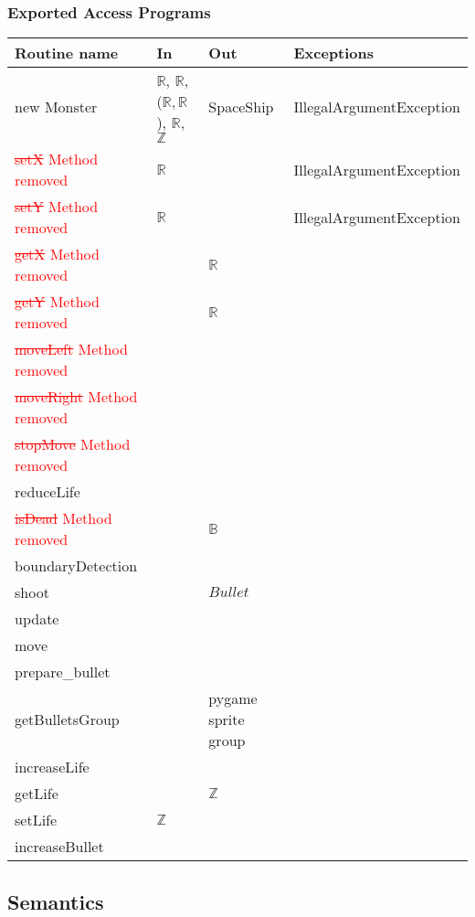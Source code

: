 \documentclass[12pt]{article}
\begin{document}
\subsubsection*{Exported Access Programs}
\begin{tabular}{| l | l | l | p{5cm} |}
\hline
\textbf{Routine name} & \textbf{In} & \textbf{Out} & \textbf{Exceptions}\\
\hline
new Monster & $\mathbb{R}$, $\mathbb{R}$, ($\mathbb{R}, \mathbb{R}$), $\mathbb{R}$, $\mathbb{Z}$ & SpaceShip & IllegalArgumentException\\
\hline
\textcolor{red}{\st{setX} Method removed} & $\mathbb{R}$ &  & IllegalArgumentException\\
\hline
\textcolor{red}{\st{setY} Method removed} & $\mathbb{R}$ &  & IllegalArgumentException\\
\hline
\textcolor{red}{\st{getX} Method removed} &    & $\mathbb{R}$ & \\
\hline
\textcolor{red}{\st{getY} Method removed} &    & $\mathbb{R}$ & \\
\hline
\textcolor{red}{\st{moveLeft} Method removed} & & &\\
\hline
\textcolor{red}{\st{moveRight} Method removed} & & &\\
\hline
\textcolor{red}{\st{stopMove} Method removed} & & &\\
\hline
reduceLife & & & \\
\hline
\textcolor{red}{\st{isDead} Method removed} & & $\mathbb{B}$ & \\
\hline
boundaryDetection & & &\\
\hline
shoot & & $Bullet$ &\\
\hline
update &&&\\
\hline
move &&&\\
\hline
prepare\_bullet &&&\\
\hline
getBulletsGroup && pygame sprite group &\\
\hline
increaseLife &&&\\
\hline
getLife &&$\mathbb{Z}$&\\
\hline
setLife &$\mathbb{Z}$&&\\
\hline
increaseBullet &&&\\
\hline
\end{tabular}

\subsection*{Semantics}
\end{document}
